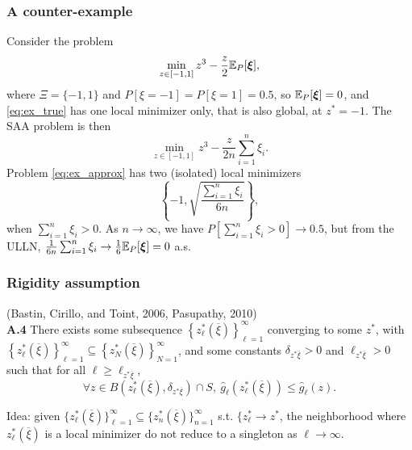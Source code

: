 \documentclass{beamer}
\def\bxi{\boldsymbol\xi}
\begin{document}
\begin{frame}
\frametitle{A counter-example}

Consider the problem
\begin{equation}\label{eq:ex_true}
\min_{z \in [-1, 1]} z^3 - \frac{z}{2}\EE_P[\bxi],
\end{equation}
where $\Xi = \lbrace -1, 1\rbrace$ and $P[\xi = -1] = P[\xi = 1] = 0.5$, so $\EE_P[\bxi] = 0$, and \eqref{eq:ex_true} has one local minimizer only, that is also global, at $z^* = -1$.
The SAA problem is then
\begin{equation}\label{eq:ex_approx}
\min_{z \in [-1, 1]} z^3 - \frac{z}{2n}\sum_{i = 1}^n \xi_i.
\end{equation}
Problem \eqref{eq:ex_approx} has two (isolated) local minimizers
\[
\left\lbrace -1, \sqrt{\frac{\sum_{i=1}^n \xi_i}{6n}}\right\rbrace,
\]
when $\sum_{i=1}^n \xi_i > 0$.
As $n \rightarrow \infty$, we have $P\left[\sum_{i=1}^n \xi_i > 0\right] \rightarrow 0.5$, but from the ULLN, $\frac{1}{6n}\sum_{i=1}^n \xi_i \rightarrow \frac{1}{6}\EE_P[\bxi] = 0$ a.s.

\end{frame}

\begin{frame}
\frametitle{Rigidity assumption}

(Bastin, Cirillo, and Toint, 2006, Pasupathy, 2010)\\
\textbf{A.4}
There exists some subsequence $\left\lbrace z^*_{\ell} (\overline{\xi}) \right\rbrace_{\ell = 1}^{\infty}$ converging to some $z^*$, with $\left\lbrace z^*_{\ell} (\overline{\xi}) \right\rbrace_{\ell = 1}^{\infty} \subseteq \left\lbrace z^*_{N} (\overline{\xi}) \right\rbrace_{N = 1}^{\infty}$, and some constants $\delta_{z^*\overline{\xi}} >0$ and $\ell_{z^* \overline{\xi}} > 0$ such that for all $\ell \geq \ell_{ z^* \overline{\xi}}$,
\[
\forall z \in B\left( z_{\ell}^*(\overline{\xi}), \delta_{z^*
	\overline{\xi}} \right) \cap S, \  \hat{g}_{\ell} \left(
z_{\ell}^*(\overline{\xi}) \right) \leq \hat{g}_{\ell}(z).
\]

\mbox{}

{\blue Idea:} given $\lbrace z^*_{\ell} (\overline{\xi}) \rbrace_{\ell = 1}^{\infty} \subseteq \lbrace z^*_{n} (\overline{\xi}) \rbrace_{n = 1}^{\infty}$ s.t. $\lbrace z^*_{\ell} \rightarrow z^*$, the neighborhood where $z_{\ell}^*(\overline{\xi})$ is a local minimizer do not reduce to a singleton as $\ell \rightarrow \infty$.

\noindent

\end{frame}
\end{document}
